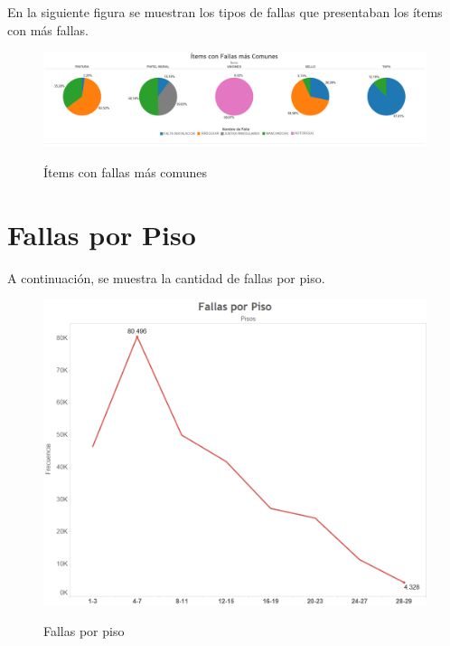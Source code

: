 \documentclass[letter,12pt,oneside]{report}
\begin{document}
En la siguiente figura se muestran los tipos de fallas que presentaban los ítems con más fallas.

\begin{figure}[H]
\begin{center}
\includegraphics[scale=0.44]{images/items_fallas.png}
\caption{Ítems con fallas más comunes}
\label{}
\end{center}
\end{figure}

\section{Fallas por Piso}
A continuación, se muestra la cantidad de fallas por piso.
\begin{figure}[H]
\begin{center}
\includegraphics[scale=0.7]{images/fallas_piso.png}
\caption{Fallas por piso}
\label{}
\end{center}
\end{figure}



\newpage
\fancyhf{}
\lhead{\leftmark}
\fancyfoot[R]{\thepage}



\end{document}
